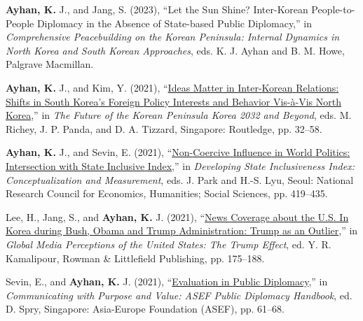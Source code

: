 \documentclass[11pt,a4paper,]{awesome-cv}
\begin{document}
\leavevmode{}%
\textbf{Ayhan, K.} J., and Jang, S. (2023), {``Let the {Sun} {Shine}?
{Inter}-{Korean} {People}-to-{People} {Diplomacy} in the {Absence} of
{State}-based {Public} {Diplomacy},''} in \emph{Comprehensive
{Peacebuilding} on the {Korean} {Peninsula}: {Internal} {Dynamics} in
{North} {Korea} and {South} {Korean} {Approaches}}, eds. K. J. Ayhan and
B. M. Howe, Palgrave Macmillan.

\leavevmode{}%
\textbf{Ayhan, K.} J., and Kim, Y. (2021),
{``\href{https://www.taylorfrancis.com/chapters/edit/10.4324/9781003148890-2/ideas-matter-inter-korean-relations-kadir-jun-ayhan-yuree-kim}{Ideas
{Matter} in {Inter}-{Korean} {Relations}: {Shifts} in {South} {Korea}'s
{Foreign} {Policy} {Interests} and {Behavior} {Vis}-à-{Vis} {North}
{Korea}},''} in \emph{The {Future} of the {Korean} {Peninsula} {Korea}
2032 and {Beyond}}, eds. M. Richey, J. P. Panda, and D. A. Tizzard,
Singapore: Routledge, pp. 32--58.

\leavevmode{}%
\textbf{Ayhan, K.} J., and Sevin, E. (2021),
{``\href{https://www.kipa.re.kr/site/mblk/research/selectBaseView.do?gubun=CO\&seqNo=BASE_000000000000634}{Non-{Coercive}
{Influence} in {World} {Politics}: {Intersection} with {State}
{Inclusive} {Index}},''} in \emph{Developing {State} {Inclusiveness}
{Index}: {Conceptualization} and {Measurement}}, eds. J. Park and H.-S.
Lyu, Seoul: National Research Council for Economics, Humanities; Social
Sciences, pp. 419--435.

\leavevmode{}%
Lee, H., Jang, S., and \textbf{Ayhan, K.} J. (2021),
{``\href{https://rowman.com/ISBN/9781538142417/Global-Media-Perceptions-of-the-United-States-The-Trump-Effect}{News
{Coverage} about the {U}.{S}. In {Korea} during {Bush}, {Obama} and
{Trump} {Administration}: {Trump} as an {Outlier}},''} in \emph{Global
{Media} {Perceptions} of the {United} {States}: {The} {Trump} {Effect}},
ed. Y. R. Kamalipour, Rowman \& Littlefield Publishing, pp. 175--188.

\leavevmode{}%
Sevin, E., and \textbf{Ayhan, K.} J. (2021),
{``\href{https://asef.org/publications/communicating-with-purpose-and-value/}{Evaluation
in {Public} {Diplomacy}},''} in \emph{Communicating with {Purpose} and
{Value}: {ASEF} {Public} {Diplomacy} {Handbook}}, ed. D. Spry,
Singapore: Asia-Europe Foundation (ASEF), pp. 61--68.
\end{document}
